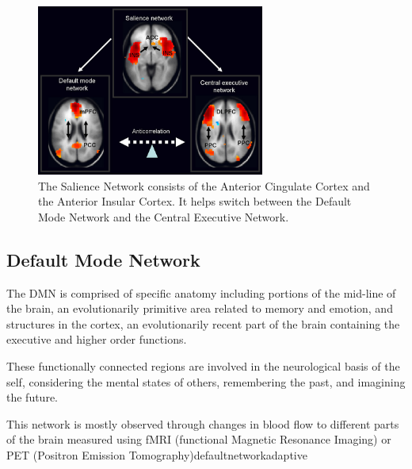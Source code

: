 \documentclass[a4paper, amsfonts, amssymb, amsmath, reprint, showkeys, nofootinbib, twoside]{revtex4-1}
\begin{document}
\begin{figure}[H]
  \centering
  \includegraphics[width=7.5cm]{images/top-dmn-sn-cen-switching.jpg}
  \caption{The Salience Network consists of the Anterior Cingulate Cortex and the
    Anterior Insular Cortex. It helps switch between the Default Mode Network and the
  Central Executive Network.}
  \label{fig:top-dmn-sn-cen-switching}
\end{figure}

\subsection{Default Mode Network}

The DMN is comprised of specific anatomy including portions of the mid-line of the
brain, an evolutionarily primitive area related to memory and emotion, and
structures in the cortex, an evolutionarily recent part of the brain containing the
executive and higher order functions. \cite{defaultnetworkanatomy} 

These functionally connected regions are involved in the neurological basis
of the self, considering the mental states of others, remembering the past, and
imagining the future. 

This network is mostly observed through changes in blood flow to different parts of 
the brain measured using fMRI (functional Magnetic Resonance Imaging) or 
PET (Positron Emission Tomography){defaultnetworkadaptive}
\end{document}

